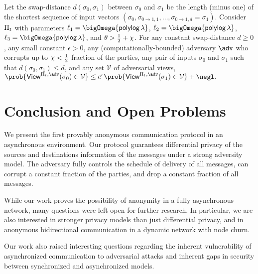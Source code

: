 \documentclass[runningheads,a4paper]{llncs}
\begin{document}
\begin{corollary} \label{cor:mixing}
Let the swap-distance $d(\sigma_0, \sigma_1)$ between $\sigma_0$ and $\sigma_1$ be the length (minus one) of the shortest sequence of input vectors $(\sigma_0, \sigma_{0\rightarrow 1, 1}, \dots, \sigma_{0\rightarrow 1, d}=\sigma_1)$. 
Consider $\Pi_t$ with parameters
$\ell_1 = \bigOmega{\polylog \thinspace\secpar}$, $\ell_2 = \bigOmega{\polylog \thinspace\secpar}$, 
$\ell_3 = \bigOmega{\polylog\thinspace\secpar}$, and 
$\theta > \frac{1}{2} + \chi$. 
For any constant swap-distance $d\ge0$, 
any small constant $\epsilon > 0$, 
any (computationally-bounded) adversary $\adv$ who corrupts up to $\chi < \frac{1}{2}$ fraction of the parties,  
any pair of inputs $\sigma_0$ and $\sigma_1$ such that $d(\sigma_0, \sigma_1) \le d$, and 
any set $\mathcal{V}$ of adversarial views, 
$
\prob{\mathsf{View}^{\protocol, \adv}(\sigma_0) \in \mathcal{V}} \le e^\epsilon \prob{\mathsf{View}^{\protocol, \adv}(\sigma_1) \in \mathcal{V}} + \negl .
$
\end{corollary}


\section{Conclusion and Open Problems}
We present the first provably anonymous communication protocol in an asynchronous environment. Our protocol guarantees differential privacy of the sources and destinations information of the messages under a strong adversity model. The adversary fully controls the schedule of delivery of all messages, can corrupt a constant fraction of the parties, and drop a constant fraction of all messages. 

While our work proves the possibility of anonymity in a fully asynchronous network, many questions were left open for further research. In particular, we are also interested in stronger privacy models than just differential privacy, and in anonymous bidirectional communication in a dynamic network with node churn.

Our work also raised interesting questions regarding the inherent vulnerability of asynchronized communication to adversarial attacks and inherent gaps in security between synchronized and asynchronized models. 
\end{document}
